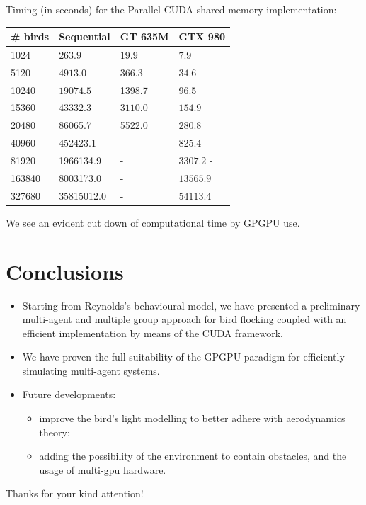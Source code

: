 \documentclass{beamer}
\begin{document}

\begin{frame}
Timing (in seconds) for the Parallel CUDA shared memory implementation:
\begin{table} [h!]
	\centering
	\begin{tabular}{|l |l |l| l|}
	\hline
	\# birds & Sequential & GT	635M & GTX 980
	\\
	\hline
	

	1024  & \(263.9\) & $19.9$ & $7.9$  \\
	5120  & \(4913.0\) & $366.3$ & $34.6$  \\
	10240 &  $19074.5$ & 1398.7 & 96.5  \\
	15360  & \(43332.3\) & $3110.0$ & $154.9$  \\
	20480  & 86065.7 & 5522.0 & $280.8$ \\
	40960  & 452423.1 & - & $825.4$ \\
	81920  & 1966134.9 & - & $3307.2$ - \\
	163840  & 8003173.0 & - & $13565.9$ \\
	327680  & 35815012.0 & - & $54113.4$  \\
	\hline
	\end{tabular}
	\label{tab:ifdiv}
\end{table}
We see an evident cut down of computational time by GPGPU use.
\end{frame}
\section{Conclusions}
\begin{frame}
\begin{itemize}
\item Starting from Reynolds's behavioural model, we have 
presented a preliminary multi-agent and multiple group approach for bird flocking coupled with an efficient implementation by means of the CUDA framework.
\item We have proven the full suitability of the GPGPU paradigm for efficiently simulating multi-agent systems.
\item Future developments:
\begin{itemize}
\item improve the bird's light modelling to better adhere with aerodynamics theory;
\item adding the possibility of the environment to contain obstacles, and the usage of multi-gpu hardware.
\end{itemize}
\end{itemize}
\end{frame}

\begin{frame}
\begin{center}
\begin{huge}Thanks for your kind attention! \end{huge}
\end{center}

\end{frame}
\end{document}
